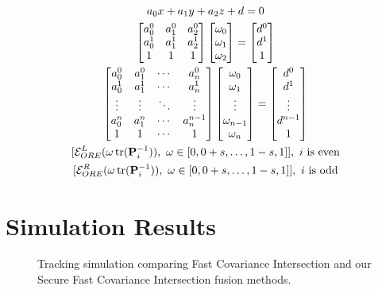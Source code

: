 \documentclass[letterpaper, 10 pt, conference]{ieeeconf}  %
\begin{document}
\begin{gather}
   a_0x + a_1y +a_2z + d = 0 \\
   \begin{bmatrix}
      a_0^0 & a_1^0 & a_2^0 \\
      a_0^1 & a_1^1 & a_2^1 \\
      1 & 1 & 1
   \end{bmatrix}
   \begin{bmatrix}
      \omega_0 \\
      \omega_1 \\
      \omega_2
   \end{bmatrix}
   =
   \begin{bmatrix}
      d^0 \\
      d^1 \\
      1
   \end{bmatrix} \\
   \begin{bmatrix}
      a_0^0 & a_1^0 & \cdots & a_n^0 \\
      a_0^1 & a_1^1 & \cdots & a_n^1 \\
      \vdots & \vdots & \ddots & \vdots \\
      a_0^n & a_1^n & \cdots & a_n^{n-1} \\
      1 & 1 & \cdots & 1
   \end{bmatrix}
   \begin{bmatrix}
      \omega_0 \\
      \omega_1 \\
      \vdots \\
      \omega_{n-1} \\
      \omega_n
   \end{bmatrix}
   =
   \begin{bmatrix}
      d^0 \\
      d^1 \\
      \vdots \\
      d^{n-1} \\
      1
   \end{bmatrix} \\
   [\mathcal{E}^L_{ORE}(\omega\tr(\mP^{-1}_i)),\ \omega \in [0,0+s,\dots,1-s,1]],\ i\text{ is even} \\
   [\mathcal{E}^R_{ORE}(\omega\tr(\mP^{-1}_i)),\ \omega \in [0,0+s,\dots,1-s,1]],\ i\text{ is odd}
\end{gather}

\section{Simulation Results}
\begin{figure}[h]
   \centering
   \caption{Tracking simulation comparing Fast Covariance Intersection and our Secure Fast Covariance Intersection fusion methods.}
\end{figure}
\end{document}
